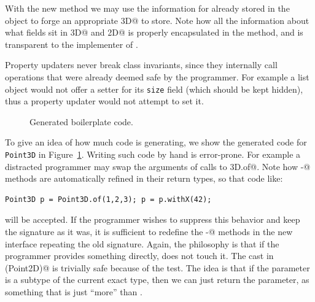 With the new \Q@with@ method we may use the information for
\Q@z@ already stored in the object to forge an appropriate \Q@Point3D@
to store. Note how all the information about what fields sit in
\Q@Point3D@ and \Q@Point2D@ is properly encapsulated in the
\Q@with@ method, and is transparent to the implementer of \Q@Bird@.

Property updaters never break class invariants, since they
internally call operations that were already deemed
safe by the programmer. For example a list object
would not offer a setter for its \texttt{size} field (which should be kept hidden), thus
a property updater would not attempt to set it.



\begin{figure}
\saveSpaceFig
\caption{Generated boilerplate code.}
\label{fig:boilerplate}
\saveSpaceFig
\end{figure}

To give an idea of how much code \mixin is generating, we show the
generated code for \texttt{Point3D} in Figure~\ref{fig:boilerplate}.
Writing such code by hand is error-prone. For
example a distracted programmer may swap the arguments of calls to
\Q@Point3D.of@.  Note how \Q@with-@ methods are automatically refined in their
return types, so that code like:

\begin{lstlisting}
Point3D p = Point3D.of(1,2,3); p = p.withX(42);
\end{lstlisting}

\noindent will be accepted. If the programmer wishes to suppress this behavior
and keep the signature as it was, it is sufficient to redefine the \Q@with-@
methods in the new interface repeating the old signature.  Again, the philosophy
is that if the programmer provides something directly, \mixin does not touch it.
The cast in \Q@with(Point2D)@ is trivially safe because of the \Q@instanceof@
test. The idea is that if the parameter is a subtype of the current exact type,
then we can just return the parameter, as something that is just ``more'' than
\Q@this@.

